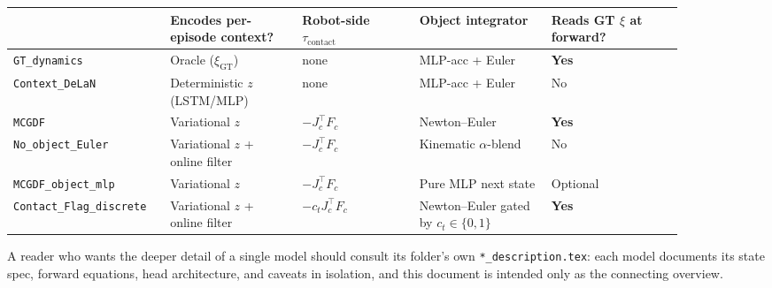 \documentclass[11pt]{article}
\begin{document}
\begin{center}
\small
\renewcommand{\arraystretch}{1.25}
\begin{tabular}{p{0.18\linewidth} p{0.18\linewidth} p{0.16\linewidth} p{0.18\linewidth} p{0.18\linewidth}}
\toprule
 & Encodes per-episode context? & Robot-side $\tau_{\mathrm{contact}}$ & Object integrator & Reads GT $\xi$ at forward? \\
\midrule
\texttt{GT\_dynamics}            & Oracle ($\xi_{\mathrm{GT}}$) & none      & MLP-acc + Euler         & \textbf{Yes} \\
\texttt{Context\_DeLaN}          & Deterministic $z$ (LSTM/MLP) & none      & MLP-acc + Euler         & No \\
\texttt{MCGDF}                   & Variational $z$              & $-J_c^\top F_c$  & Newton--Euler           & \textbf{Yes} \\
\texttt{No\_object\_Euler}       & Variational $z$ + online filter & $-J_c^\top F_c$  & Kinematic $\alpha$-blend & No \\
\texttt{MCGDF\_object\_mlp}      & Variational $z$              & $-J_c^\top F_c$  & Pure MLP next state     & Optional \\
\texttt{Contact\_Flag\_discrete} & Variational $z$ + online filter & $-c_t J_c^\top F_c$ & Newton--Euler gated by $c_t \in \{0,1\}$ & \textbf{Yes} \\
\bottomrule
\end{tabular}
\end{center}

A reader who wants the deeper detail of a single model should consult
its folder's own \texttt{*\_description.tex}: each model documents its
state spec, forward equations, head architecture, and caveats in
isolation, and this document is intended only as the connecting
overview.
\end{document}
